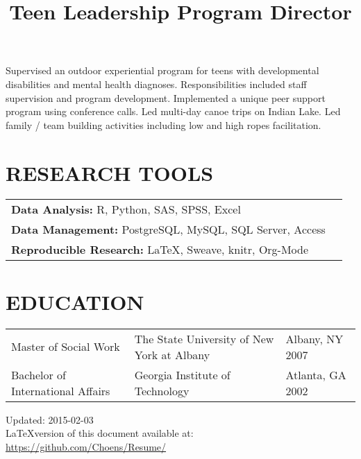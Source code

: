 \documentclass[line, margin, 10pt]{res}
\begin{document}
\begin{resume}
  \title{Teen Leadership Program Director}
  \begin{position}
    Supervised an outdoor experiential program for teens with
    developmental disabilities and mental health
    diagnoses. Responsibilities included staff supervision and program
    development. Implemented a unique peer support program using
    conference calls. Led multi-day canoe trips on Indian Lake. Led family
    / team building activities including low and high ropes
    facilitation.
  \end{position}

  \section{RESEARCH TOOLS}

  \begin{tabular} {l l}
    {\bf Data Analysis:} R, Python, SAS, SPSS, Excel\\
    {\bf Data Management:} PostgreSQL, MySQL, SQL Server, Access\\
    {\bf Reproducible Research:} \LaTeX, Sweave, knitr, Org-Mode\\
  \end{tabular}

  \section{EDUCATION}
  \begin{tabular} {p{1.5in} p{2.125in} p{.75in}}
    Master of Social Work & The State University of New  York at Albany & Albany, NY 2007 \\
    Bachelor of International Affairs & Georgia Institute of
    Technology & Atlanta, GA 2002 
  \end{tabular}

  \vspace{.25in}
  Updated: 2015-02-03 \\
  \LaTeX version of this document available at:
  \href{https://github.com/Choens/Resume/}{https://github.com/Choens/Resume/}

  \vspace{.125in} 

\end{resume}
\end{document}
